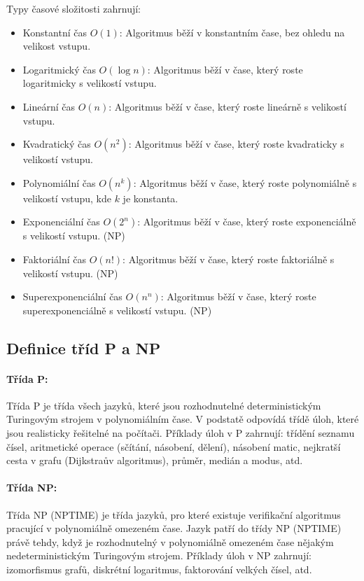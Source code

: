 Typy časové složitosti zahrnují:
\begin{itemize}
\item Konstantní čas $O(1)$: Algoritmus běží v konstantním čase, bez ohledu na velikost vstupu.
\item Logaritmický čas $O(\log n)$: Algoritmus běží v čase, který roste logaritmicky s velikostí vstupu.
\item Lineární čas $O(n)$: Algoritmus běží v čase, který roste lineárně s velikostí vstupu.
\item Kvadratický čas $O(n^2)$: Algoritmus běží v čase, který roste kvadraticky s velikostí vstupu.
\item Polynomiální čas $O(n^k)$: Algoritmus běží v čase, který roste polynomiálně s velikostí vstupu, kde $k$ je konstanta.
\item Exponenciální čas $O(2^n)$: Algoritmus běží v čase, který roste exponenciálně s velikostí vstupu. (NP)
\item Faktoriální čas $O(n!)$: Algoritmus běží v čase, který roste faktoriálně s velikostí vstupu. (NP)
\item Superexponenciální čas $O(n^n)$: Algoritmus běží v čase, který roste superexponenciálně s velikostí vstupu. (NP)
\end{itemize}

\subsection{Definice tříd P a NP}
\paragraph*{Třída P:} Třída P je třída všech jazyků, které jsou rozhodnutelné deterministickým Turingovým strojem 
v polynomiálním čase. V podstatě odpovídá třídě úloh, které jsou realisticky řešitelné 
na počítači. Příklady úloh v P zahrnují: třídění seznamu čísel, aritmetické operace 
(sčítání, násobení, dělení), násobení matic, nejkratší cesta v grafu 
(Dijkstraův algoritmus), průměr, medián a modus, atd.

\paragraph*{Třída NP:} Třída NP (NPTIME) je třída jazyků, pro které existuje 
verifikační algoritmus pracující v polynomiálně omezeném čase.
Jazyk patří do třídy NP (NPTIME) právě tehdy, když je rozhodnutelný v polynomiálně 
omezeném čase nějakým nedeterministickým Turingovým strojem. Příklady úloh v NP 
zahrnují: izomorfismus grafů, diskrétní logaritmus, faktorování velkých čísel, atd.

